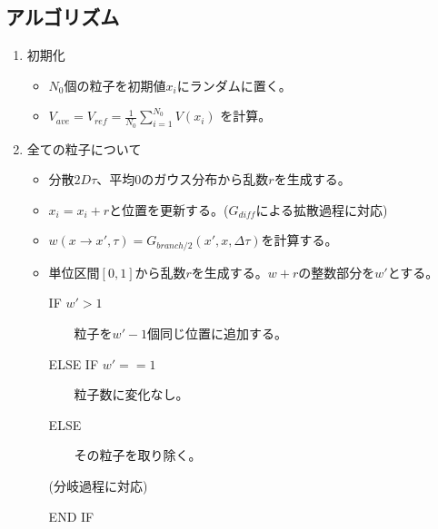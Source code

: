 \documentclass[dvipdfmx]{beamer}
\begin{document}
    \subsection{アルゴリズム}

    \begin{frame}{\insertsubsection}
        \begin{enumerate}
            \item 初期化
            \begin{itemize}
                \item $N_0$個の粒子を初期値$x_i$にランダムに置く。
                \item $V_{ave} = V_{ref} = \frac{1}{N_0} \sum_{i=1}^{N_0}V(x_i)$ を計算。
            \end{itemize}

            \item 全ての粒子について
            \begin{itemize}
                \item 分散$2D\tau$、平均$0$のガウス分布から乱数$r$を生成する。
                \item $x_i = x_i + r$と位置を更新する。($G_{diff}$による拡散過程に対応)
                \item $w(x\to x',\tau) = G_{branch/2}(x',x,\Delta\tau)$を計算する。
                \item 単位区間$[0,1]$から乱数$r$を生成する。$w+r$の整数部分を$w'$とする。

                IF $w' > 1$

                ~~~~粒子を$w'-1$個同じ位置に追加する。

                ELSE IF $w' == 1$

                ~~~~粒子数に変化なし。

                ELSE

                ~~~~その粒子を取り除く。

                (分岐過程に対応)

                END IF
            \end{itemize}

        \end{enumerate}

    \end{frame}
\end{document}
